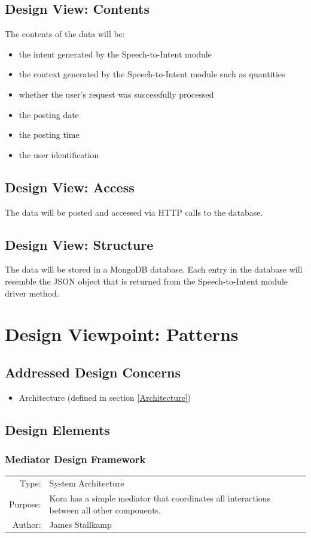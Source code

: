 \documentclass[onecolumn, draftclsnofoot,10pt, compsoc]{IEEEtran}
\def \botname{Kora\xspace}
\newcommand{\designConcernRef}[1]{
    #1 (defined in section \ref{#1})
}
\newcommand{\designElementDef}[4]{
    \subsubsection{#1}\label{#1}
    \begin{tabular}[t]{r p{6in}}
        Type: & #2 \\
        Purpose: & #3 \\
        Author: & #4 \\
    \end{tabular}
}
\begin{document}
	\subsection{Design View: Contents}
		The contents of the data will be:
		\begin{itemize}
			\item the intent generated by the Speech-to-Intent module
			\item the context generated by the Speech-to-Intent module such as quantities
			\item whether the user's request was successfully processed
			\item the posting date
			\item the posting time
			\item the user identification
		\end{itemize}
	
	\subsection{Design View: Access}
		The data will be posted and accessed via HTTP calls to the database.
	
	\subsection{Design View: Structure}
		The data will be stored in a MongoDB database.
		Each entry in the database will resemble the JSON object that is returned from the Speech-to-Intent module driver method.
		
		

\section{Design Viewpoint: Patterns}
    \subsection{Addressed Design Concerns}
        \begin{itemize}
            \item \designConcernRef{Architecture}
        \end{itemize}

    \subsection{Design Elements}
		\designElementDef{Mediator Design Framework}
						 {System Architecture}
						 {\botname has a simple mediator that coordinates all interactions between all other components.}
						 {James Stallkamp}
\end{document}

